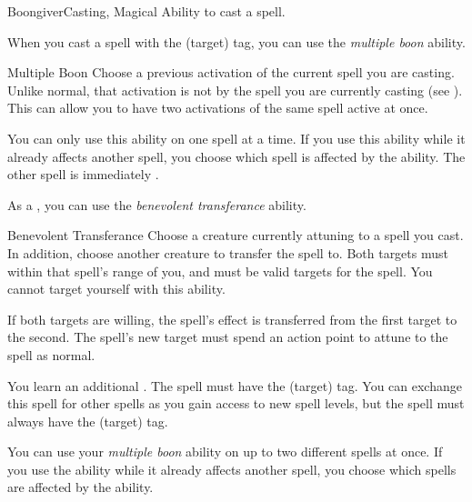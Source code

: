     \begin{feat}{Boongiver}{Casting, Magical}
        \featpre Ability to cast a spell.

         When you cast a spell with the  (target) tag, you can use the \textit{multiple boon} ability.
        \begin{ability}{Multiple Boon}
            Choose a previous activation of the current spell you are casting.
            Unlike normal, that activation is not  by the spell you are currently casting (see ).
            This can allow you to have two activations of the same spell active at once.

            You can only use this ability on one spell at a time.
            If you use this ability while it already affects another spell, you choose which spell is affected by the ability.
            The other spell is immediately .
        \end{ability}

         As a , you can use the \textit{benevolent transferance} ability.
        \begin{ability}{Benevolent Transferance}
            Choose a creature currently attuning to a spell you cast.
            In addition, choose another creature to transfer the spell to.
            Both targets must within that spell's range of you, and must be valid targets for the spell.
            You cannot target yourself with this ability.

            If both targets are willing, the spell's effect is transferred from the first target to the second.
            The spell's new target must spend an action point to attune to the spell as normal.
        \end{ability}

         You learn an additional .
        The spell must have the  (target) tag.
        You can exchange this spell for other spells as you gain access to new spell levels, but the spell must always have the  (target) tag.

         You can use your \textit{multiple boon} ability on up to two different spells at once.
        If you use the ability while it already affects another spell, you choose which spells are affected by the ability.


\end{feat}
